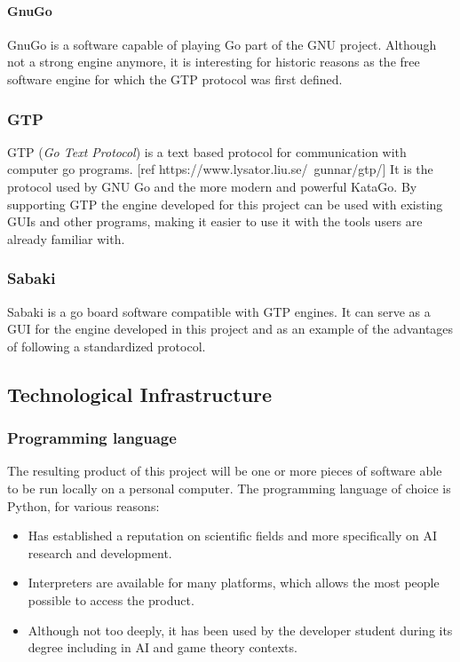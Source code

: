 \paragraph{GnuGo}

GnuGo is a software capable of playing Go part of the GNU project. Although not
a strong engine anymore, it is interesting for historic reasons as the free
software engine for which the GTP protocol was first defined.

\subsubsection{GTP}

GTP (\textit{Go Text Protocol}) is a text based protocol for communication with
computer go programs. [ref https://www.lysator.liu.se/~gunnar/gtp/] It is the
protocol used by GNU Go and the more modern and powerful KataGo. By supporting
GTP the engine developed for this project can be used with existing GUIs and
other programs, making it easier to use it with the tools users are already
familiar with.

\subsubsection{Sabaki}

Sabaki is a go board software compatible with GTP engines. It can serve as a GUI
for the engine developed in this project and as an example of the advantages of
following a standardized protocol.

\subsection{Technological Infrastructure}

\subsubsection{Programming language}

The resulting product of this project will be one or more pieces of software
able to be run locally on a personal computer. The programming language of
choice is Python, for various reasons:

\begin{itemize}

	\item Has established a reputation on scientific fields and more
		specifically on AI research and development.
	\item Interpreters are available for many platforms, which allows the most
		people possible to access the product.
	\item Although not too deeply, it has been used by the developer student
		during its degree including in AI and game theory contexts.

\end{itemize}

